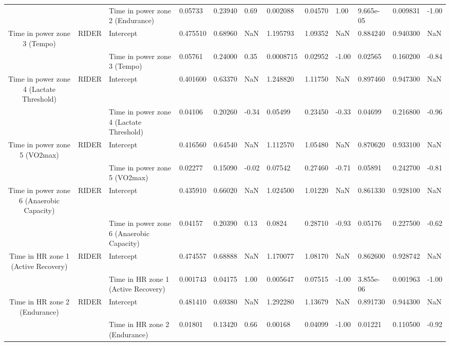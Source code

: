\begin{tabular}{c}
                                      &       & Time in power zone 2 (Endurance) &   0.05733 &  0.23940 &  0.69 &   0.002088 &  0.04570 &  1.00 &  9.665e-05 &  0.009831 & -1.00 \\
Time in power zone 3 (Tempo) & RIDER & Intercept &  0.475510 &  0.68960 &   NaN &   1.195793 &  1.09352 &   NaN &   0.884240 &  0.940300 &   NaN \\
                                      &       & Time in power zone 3 (Tempo) &   0.05761 &  0.24000 &  0.35 &  0.0008715 &  0.02952 & -1.00 &    0.02565 &  0.160200 & -0.84 \\
Time in power zone 4 (Lactate Threshold) & RIDER & Intercept &  0.401600 &  0.63370 &   NaN &   1.248820 &  1.11750 &   NaN &   0.897460 &  0.947300 &   NaN \\
                                      &       & Time in power zone 4 (Lactate Threshold) &   0.04106 &  0.20260 & -0.34 &    0.05499 &  0.23450 & -0.33 &    0.04699 &  0.216800 & -0.96 \\
Time in power zone 5 (VO2max) & RIDER & Intercept &  0.416560 &  0.64540 &   NaN &   1.112570 &  1.05480 &   NaN &   0.870620 &  0.933100 &   NaN \\
                                      &       & Time in power zone 5 (VO2max) &   0.02277 &  0.15090 & -0.02 &    0.07542 &  0.27460 & -0.71 &    0.05891 &  0.242700 & -0.81 \\
Time in power zone 6 (Anaerobic Capacity) & RIDER & Intercept &  0.435910 &  0.66020 &   NaN &   1.024500 &  1.01220 &   NaN &   0.861330 &  0.928100 &   NaN \\
                                      &       & Time in power zone 6 (Anaerobic Capacity) &   0.04157 &  0.20390 &  0.13 &     0.0824 &  0.28710 & -0.93 &    0.05176 &  0.227500 & -0.62 \\
Time in HR zone 1 (Active Recovery) & RIDER & Intercept &  0.474557 &  0.68888 &   NaN &   1.170077 &  1.08170 &   NaN &   0.862600 &  0.928742 &   NaN \\
                                      &       & Time in HR zone 1 (Active Recovery) &  0.001743 &  0.04175 &  1.00 &   0.005647 &  0.07515 & -1.00 &  3.855e-06 &  0.001963 & -1.00 \\
Time in HR zone 2 (Endurance) & RIDER & Intercept &  0.481410 &  0.69380 &   NaN &   1.292280 &  1.13679 &   NaN &   0.891730 &  0.944300 &   NaN \\
                                      &       & Time in HR zone 2 (Endurance) &   0.01801 &  0.13420 &  0.66 &    0.00168 &  0.04099 & -1.00 &    0.01221 &  0.110500 & -0.92 \\

\end{tabular}
